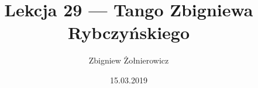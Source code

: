 \documentclass[a4paper]{article}
\begin{document}
\title{Lekcja 29 --- Tango Zbigniewa Rybczyńskiego}
\author{Zbigniew Żołnierowicz}
\date{15.03.2019}
\maketitle
\end{document}

